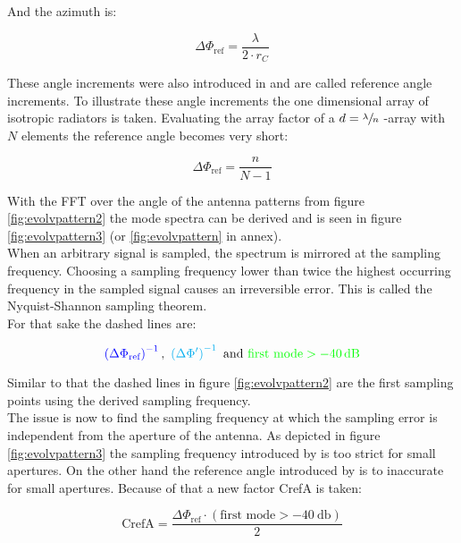 And the azimuth is:

\begin{equation}
\Delta\Phi_{\text{ref}} = \frac{\lambda}{2\cdot r_C}
\end{equation}

These angle increments were also introduced in \cite{2018arXiv180310993F} and are called reference angle increments. To illustrate these angle increments the one dimensional array of isotropic radiators is taken. Evaluating the array factor of a $d = \sfrac{\lambda}{n}$ -array with $N$ elements the reference angle becomes very short:

\begin{equation}
\Delta\Phi_{\text{ref}} = \frac{n}{N-1}
\label{eq:1dinc}
\end{equation}

With the \ac{FFT} over the angle of the antenna patterns from figure \ref{fig:evolvpattern2} the mode spectra can be derived and is seen in figure \ref{fig:evolvpattern3} (or \ref{fig:evolvpattern} in annex).\\
When an arbitrary signal is sampled, the spectrum is mirrored at the sampling frequency. Choosing a sampling frequency lower than twice the highest occurring frequency in the sampled signal causes an irreversible error. This is called the Nyquist-Shannon sampling theorem.\\
For that sake the dashed lines are:

\begin{equation}
\color{blue}\left(\Delta\Phi_{\text{ref}}\right)^{-1}\color{black},\ \color{cyan}\left(\Delta\Phi'\right)^{-1}\color{black}\ \text{and}\ \color{green}\text{first mode} > \SI{-40}{\decibel} \color{black}
\end{equation}

Similar to that the dashed lines in figure \ref{fig:evolvpattern2} are the first sampling points using the derived sampling frequency.\\
The issue is now to find the sampling frequency at which the sampling error is independent from the aperture of the antenna. As depicted in figure \ref{fig:evolvpattern3} the sampling frequency introduced by \cite{hansen} is too strict for small apertures. On the other hand the reference angle introduced by \cite{2018arXiv180310993F} is to inaccurate for small apertures. Because of that a new factor \ac{CrefA} is taken:

\begin{equation}
\text{CrefA} = \frac{\Delta\Phi_{\text{ref}}\cdot\left(\text{first mode} > \SI{-40}{\decibel}\right)}{2}
\end{equation} 


